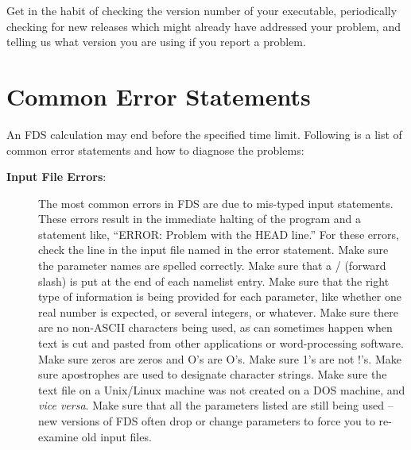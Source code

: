 \documentclass[11pt]{book}
\begin{document}
Get in the habit of checking the version number of your executable, periodically checking for new releases which
might already have addressed your problem, and telling us what version you are using if you report a problem.





\section{Common Error Statements}
\label{info:Errors}

An FDS calculation may end before the specified time limit.
Following is a list of common error statements and how to diagnose the problems:
\begin{description}
\item[{\bf Input File Errors}:]
The most common errors in FDS are due to mis-typed input statements.
These errors result in the immediate halting of the program and a statement like, ``ERROR: Problem
with the HEAD line.'' For these errors, check the line in the input file named in the error statement.
Make sure the parameter names are spelled correctly. Make sure that a / (forward slash)
is put at the end of each namelist entry. Make sure that the right type of information is
being provided for each parameter, like whether one real number is expected, or several integers, or
whatever. Make sure there are no non-ASCII characters being used, as can sometimes happen when text is
cut and pasted from other applications or word-processing software. Make sure zeros are zeros and
O's are O's. Make sure 1's are not !'s. Make sure apostrophes are used to designate character strings.
Make sure the text file on a Unix/Linux machine was not created on a DOS machine, and {\em vice versa}.
Make sure that all the parameters listed are still being used -- new versions of FDS often drop or
change parameters to force you to re-examine old input files.


\end{description}
\end{document}
